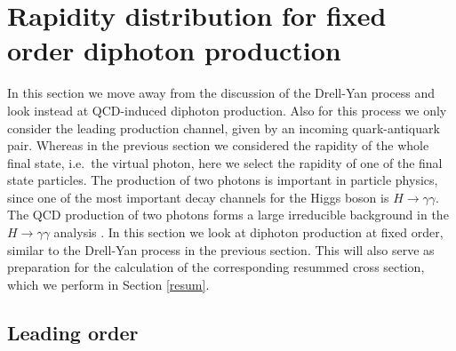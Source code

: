 \documentclass[11pt]{article}
\begin{document}

\section{Rapidity distribution for fixed order diphoton production}
\label{diphoton}

In this section we move away from the discussion of the Drell-Yan
process and look instead at QCD-induced diphoton production. Also 
for this process we only consider the leading production channel,
given by an incoming quark-antiquark pair. Whereas in the previous 
section we considered the rapidity of the whole final state, i.e.\ 
the virtual photon, here we select the rapidity of one of the final 
state particles. The production of two photons is important in
particle physics, since one of the most important decay channels for
the Higgs boson is $H\to\gamma\gamma$. The QCD production of two
photons forms a large irreducible background in the $H\to\gamma\gamma$
analysis \cite{Chatrchyan:2012ufa,Aad:2012tfa}. In this section 
we look at diphoton production at fixed order, similar to the 
Drell-Yan process in the previous section. This will also serve 
as preparation for the calculation of the corresponding
resummed cross section, which we perform in 
Section \ref{resum}.

\subsection{Leading order}
\label{fixedorder}
\end{document}
